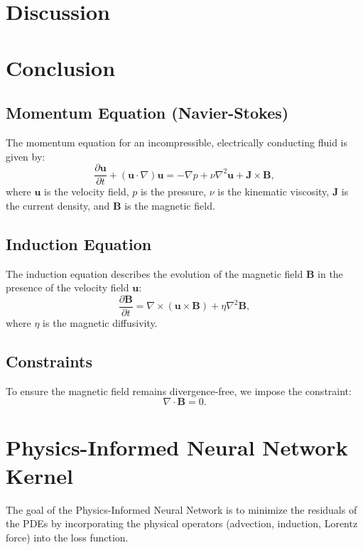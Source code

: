 \documentclass[12pt]{article}
\begin{document}
\section{Discussion}

\section{Conclusion}

\subsection{Momentum Equation (Navier-Stokes)}
The momentum equation for an incompressible, electrically conducting fluid is given by:
\begin{equation}
\frac{\partial \mathbf{u}}{\partial t} + (\mathbf{u} \cdot \nabla) \mathbf{u} = -\nabla p + \nu \nabla^2 \mathbf{u} + \mathbf{J} \times \mathbf{B},
\end{equation}
where \( \mathbf{u} \) is the velocity field, \( p \) is the pressure, \( \nu \) is the kinematic viscosity, \( \mathbf{J} \) is the current density, and \( \mathbf{B} \) is the magnetic field.

\subsection{Induction Equation}
The induction equation describes the evolution of the magnetic field \( \mathbf{B} \) in the presence of the velocity field \( \mathbf{u} \):
\begin{equation}
\frac{\partial \mathbf{B}}{\partial t} = \nabla \times (\mathbf{u} \times \mathbf{B}) + \eta \nabla^2 \mathbf{B},
\end{equation}
where \( \eta \) is the magnetic diffusivity.

\subsection{Constraints}
To ensure the magnetic field remains divergence-free, we impose the constraint:
\begin{equation}
\nabla \cdot \mathbf{B} = 0.
\end{equation}

\section{Physics-Informed Neural Network Kernel}
The goal of the Physics-Informed Neural Network is to minimize the residuals of the PDEs by incorporating the physical operators (advection, induction, Lorentz force) into the loss function.
\end{document}
